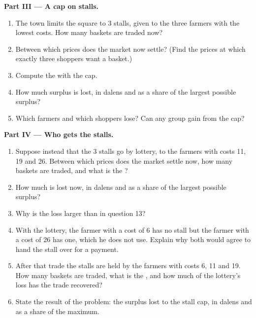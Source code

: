 \begin{problem}
\medskip
\noindent\textbf{Part III --- A cap on stalls.}
\begin{enumerate}[resume]
\item The town limits the square to 3 stalls, given to the three farmers with the lowest costs. How many baskets are traded now?
\item Between which prices does the market now settle? (Find the prices at which exactly three shoppers want a basket.)
\item Compute the  with the cap.
\item How much surplus is lost, in dalens and as a share of the largest possible surplus?
\item Which farmers and which shoppers lose? Can any group gain from the cap?
\end{enumerate}

\medskip
\noindent\textbf{Part IV --- Who gets the stalls.}
\begin{enumerate}[resume]
\item Suppose instead that the 3 stalls go by lottery, to the farmers with costs 11, 19 and 26. Between which prices does the market settle now, how many
  baskets are traded, and what is the ?
\item How much is lost now, in dalens and as a share of the largest possible surplus?
\item Why is the loss larger than in question 13?
\item With the lottery, the farmer with a cost of 6 has no stall but the farmer with a cost of 26 has one, which he does not use. Explain why both would agree
  to hand the stall over for a payment.
\item After that trade the stalls are held by the farmers with costs 6, 11 and 19. How many baskets are traded, what is the , and how much of
  the lottery's loss has the trade recovered?
\item State the result of the problem: the surplus lost to the stall cap, in dalens and as a share of the maximum.
\end{enumerate}
\end{problem}
